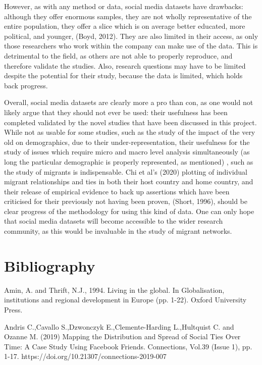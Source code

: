 \documentclass[12pt]{article}
\begin{document}
However, as with any method or data, social media datasets have drawbacks: although they offer 
enormous samples, they are not wholly representative of the entire population, they 
offer a slice which is on average better educated, more political, and younger, (Boyd, 2012). 
They are also limited in their access, as only those researchers who work within the company 
can make use of the data. This is detrimental to the field, as others are not able 
to properly reproduce, and therefore validate the studies. Also, research questions 
may have to be limited despite the potential for their study, because the data is limited, 
which holds back progress. 

Overall, social media datasets are clearly more a pro than con, as one would not likely 
argue that they should not ever be used: their usefulness has been completed validated by 
the novel studies that have been discussed in this project. While not as usable for some 
studies, such as the study of the impact of the very old on demographics, due to their 
under-representation, their usefulness for the study of issues which require micro and macro 
level analysis simultaneously (as long the particular demographic is properly represented, as mentioned)
, such as the study of migrants is indispensable. Chi et al's (2020) plotting of 
individual migrant relationships and ties in both their host country and home country, 
and their release of empirical evidence to back up assertions which have been criticised for their previously 
not having been proven, (Short, 1996), should be clear progress of the methodology for 
using this kind of data. One can only hope that social media datasets will 
become accessible to the wider 
research community, as this would be invaluable in the study of migrant networks.


\pagebreak 
\section{Bibliography}

Amin, A. and Thrift, N.J., 1994. Living in the global. In Globalisation, institutions and regional development in Europe (pp. 1-22). Oxford University Press.
\newline

Andris C.,Cavallo S.,Dzwonczyk E.,Clemente-Harding L.,Hultquist C. and Ozanne M. (2019) Mapping the Distribution and Spread of Social Ties Over Time: A Case Study Using Facebook Friends. Connections, Vol.39 (Issue 1), pp. 1-17. https://doi.org/10.21307/connections-2019-007
\newline
\end{document}
